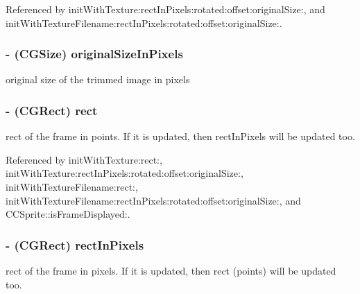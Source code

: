 Referenced by init\-With\-Texture\-:rect\-In\-Pixels\-:rotated\-:offset\-:original\-Size\-:, and init\-With\-Texture\-Filename\-:rect\-In\-Pixels\-:rotated\-:offset\-:original\-Size\-:.

\hypertarget{interface_c_c_sprite_frame_a7ec8a93d1aa970d2b0f9574874e8df48}{
\subsubsection[{original\-Size\-In\-Pixels}]{\setlength{\rightskip}{0pt plus 5cm}-\/ (C\-G\-Size) {\bf original\-Size\-In\-Pixels}}}\label{interface_c_c_sprite_frame_a7ec8a93d1aa970d2b0f9574874e8df48}
original size of the trimmed image in pixels \hypertarget{interface_c_c_sprite_frame_a7c5eb9c09bca5b2dac1a5d2c988affdb}{
\subsubsection[{rect}]{\setlength{\rightskip}{0pt plus 5cm}-\/ (C\-G\-Rect) {\bf rect}}}\label{interface_c_c_sprite_frame_a7c5eb9c09bca5b2dac1a5d2c988affdb}
rect of the frame in points. If it is updated, then rect\-In\-Pixels will be updated too. 

Referenced by init\-With\-Texture\-:rect\-:, init\-With\-Texture\-:rect\-In\-Pixels\-:rotated\-:offset\-:original\-Size\-:, init\-With\-Texture\-Filename\-:rect\-:, init\-With\-Texture\-Filename\-:rect\-In\-Pixels\-:rotated\-:offset\-:original\-Size\-:, and C\-C\-Sprite\-::is\-Frame\-Displayed\-:.

\hypertarget{interface_c_c_sprite_frame_a0b1ba9e7d49cfa23b120828b8dc1dfea}{
\subsubsection[{rect\-In\-Pixels}]{\setlength{\rightskip}{0pt plus 5cm}-\/ (C\-G\-Rect) {\bf rect\-In\-Pixels}}}\label{interface_c_c_sprite_frame_a0b1ba9e7d49cfa23b120828b8dc1dfea}
rect of the frame in pixels. If it is updated, then rect (points) will be updated too. 

